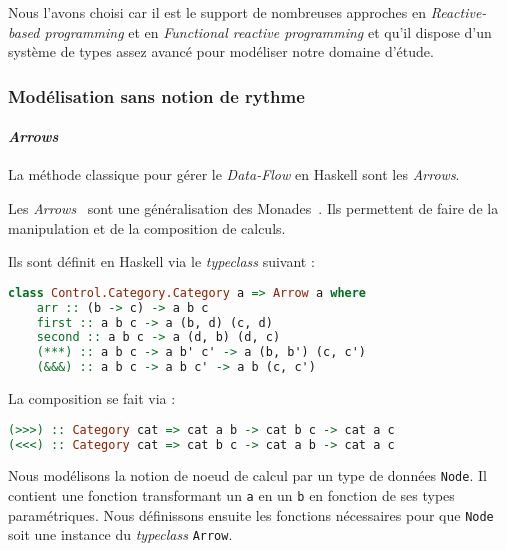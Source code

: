 \documentclass{llncs}
\newcommand{\DF}{\emph{Data-Flow} }
\newcommand{\RP}{\emph{Reactive-based programming} }
\newcommand{\FRP}{\emph{Functional reactive programming} }
\begin{document}
Nous l'avons choisi car il est le support de nombreuses approches en \RP
et en \FRP et qu'il dispose d'un système de types assez avancé pour modéliser
notre domaine d'étude.

\subsubsection{Modélisation sans notion de rythme}
\paragraph{\emph{Arrows}}
La méthode classique pour gérer le \DF en Haskell sont les \emph{Arrows}.

Les \emph{Arrows}~\cite{Hughes00} sont une généralisation des Monades~\cite{Wadler90}.
Ils permettent de faire de la manipulation et de la composition de calculs.

Ils sont définit en Haskell via le \emph{typeclass} suivant :
\begin{lstlisting}[language=haskell]
class Control.Category.Category a => Arrow a where
    arr :: (b -> c) -> a b c
    first :: a b c -> a (b, d) (c, d)
    second :: a b c -> a (d, b) (d, c)
    (***) :: a b c -> a b' c' -> a (b, b') (c, c')
    (&&&) :: a b c -> a b c' -> a b (c, c')
\end{lstlisting}

La composition se fait via :
\begin{lstlisting}[language=haskell]
(>>>) :: Category cat => cat a b -> cat b c -> cat a c
(<<<) :: Category cat => cat b c -> cat a b -> cat a c
\end{lstlisting}

Nous modélisons la notion de noeud de calcul par un type de données
\texttt{Node}.
Il contient une fonction transformant un \texttt{a} en un \texttt{b} en fonction
de ses types paramétriques.
Nous définissons ensuite les fonctions nécessaires pour que \texttt{Node} soit
une instance du \emph{typeclass} \texttt{Arrow}.
\end{document}
